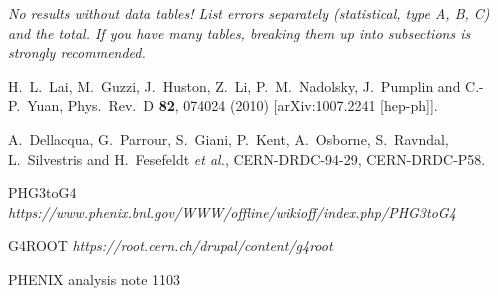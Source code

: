 \documentclass[12pt]{article}
\begin{document}
{\it
  No results without data tables!  List errors separately
  (statistical, type A, B, C) and the total.  If you have many tables,
  breaking them up into subsections is strongly recommended.
}


\begin{thebibliography}{9}

  H.~L.~Lai, M.~Guzzi, J.~Huston, Z.~Li, P.~M.~Nadolsky, J.~Pumplin and C.-P.~Yuan,
  Phys.\ Rev.\ D {\bf 82}, 074024 (2010)
  [arXiv:1007.2241 [hep-ph]].


  A.~Dellacqua, G.~Parrour, S.~Giani, P.~Kent, A.~Osborne, S.~Ravndal, L.~Silvestris and H.~Fesefeldt {\it et al.},
  CERN-DRDC-94-29, CERN-DRDC-P58.

 PHG3toG4
   {\it https://www.phenix.bnl.gov/WWW/offline/wikioff/index.php/PHG3toG4 }

 G4ROOT
   {\it https://root.cern.ch/drupal/content/g4root}
   
 PHENIX analysis note 1103


\end{thebibliography}
\end{document}
